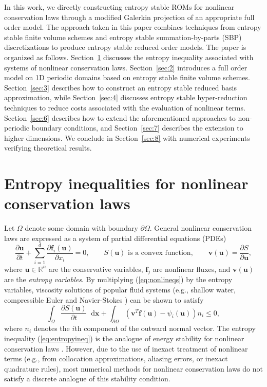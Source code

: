 \documentclass[review]{siamart171218}
\theoremstyle{assumption}
\newcommand*\diff[1]{\mathop{}\!{\mathrm{d}#1}}
\newcommand{\pd}[2]{\frac{\partial#1}{\partial#2}}
\newcommand{\LRp}[1]{\left( #1 \right)}
\begin{document}
In this work, we directly constructing entropy stable ROMs for nonlinear conservation laws through a modified Galerkin projection of an appropriate full order model.  The approach taken in this paper combines techniques from entropy stable finite volume schemes \cite{tadmor1987numerical, tadmor2003entropy} and entropy stable summation-by-parts (SBP) discretizations \cite{fisher2013high, carpenter2014entropy, chen2017entropy, crean2018entropy, chan2017discretely, chan2018discretely, chan2019skew} to produce entropy stable reduced order models.  The paper is organized as follows.  Section~\ref{sec:1} discusses the entropy inequality associated with systems of nonlinear conservation laws.  Section~\ref{sec:2} introduces a full order model on 1D periodic domains based on entropy stable finite volume schemes.  Section~\ref{sec:3} describes how to construct an entropy stable reduced basis approximation, while Section~\ref{sec:4} discusses entropy stable hyper-reduction techniques to reduce costs associated with the evaluation of nonlinear terms.  Section~\ref{sec:6} describes how to extend the aforementioned approaches to non-periodic boundary conditions, and Section~\ref{sec:7} describes the extension to higher dimensions.  We conclude in Section~\ref{sec:8} with numerical experiments verifying theoretical results.

\section{Entropy inequalities for nonlinear conservation laws}
\label{sec:1}
Let $\Omega$ denote some domain with boundary $\partial \Omega$.  General nonlinear conservation laws are expressed as a system of partial differential equations (PDEs) 
\begin{equation}
\pd{\bm{u}}{t}  + \sum_{i=1}^d\pd{\bm{f}_i(\bm{u})}{x_i} = 0, \qquad 
S(\bm{u}) \text{ is a convex function}, \qquad
\bm{v}(\bm{u}) = \pd{S}{\bm{u}},
\label{eq:nonlineqs}
\end{equation}
where $\bm{u}\in \mathbb{R}^n$ are the conservative variables, $\bm{f}_j$ are nonlinear fluxes, and $\bm{v}(\bm{u})$ are the \textit{entropy variables}.  By multiplying (\ref{eq:nonlineqs}) by the entropy variables, viscosity solutions \cite{oleinik1957discontinuous, kruvzkov1970first}  of popular fluid systems (e.g., shallow water, compressible Euler and Navier-Stokes \cite{hughes1986new, chen2017entropy}) can be shown to satisfy 
\begin{equation}
\int_{\Omega}\pd{S(\bm{u})}{t}\diff{\bm{x}} + \int_{\partial \Omega} \LRp{\bm{v}^T\bm{f}(\bm{u}) - \psi_i(\bm{u})}n_i \leq 0\label{eq:entropyineq},
\end{equation}
where $n_i$ denotes the $i$th component of the outward normal vector.  
The entropy inequality (\ref{eq:entropyineq}) is the analogue of energy stability for nonlinear conservation laws \cite{mock1980systems, harten1983symmetric}.  
However, due to the use of inexact treatment of nonlinear terms (e.g., from collocation approximations, aliasing errors, or inexact quadrature rules), most numerical methods for nonlinear conservation laws do not satisfy a discrete analogue of this stability condition. 
\end{document}
